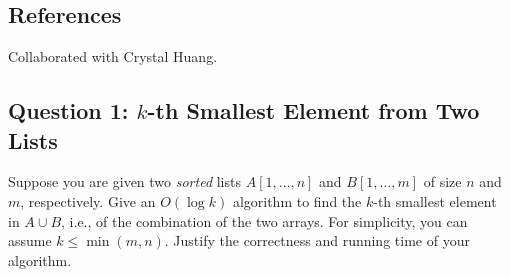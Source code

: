 \def\lc{\left\lceil}   
\def\rc{\right\rceil}
\runningheadrule
\firstpageheadrule
\cfoot{}

\newcommand{\True}{\mathtt{true}}
\newcommand{\False}{\mathtt{false}}

\subsection*{References}

Collaborated with Crystal Huang.

\subsection*{Question 1: $k$-th Smallest Element from Two Lists}

Suppose you are given two \emph{sorted} lists $A[1,\ldots,n]$ and $B[1,\ldots,m]$ of size $n$ and $m$, respectively. Give an $O(\log k)$ algorithm to find the $k$-th
smallest element in $A \cup B$, i.e., of the combination of the two arrays. For simplicity, you can assume $k \leq \min(m,n)$. Justify the correctness and running time of your algorithm. 

